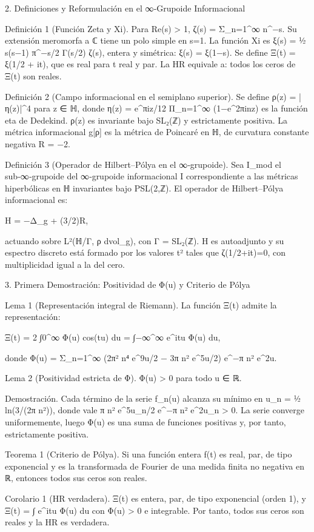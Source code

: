\documentclass[12pt,a4paper]{book}
\begin{document}
2. Definiciones y Reformulación en el ∞‑Grupoide Informacional

Definición 1 (Función Zeta y Xi). Para Re(s) > 1, ζ(s) = Σ_{n=1}^∞ n^{−s}. Su extensión meromorfa a ℂ tiene un polo simple en s=1. La función Xi es ξ(s) = ½ s(s−1) π^{−s/2} Γ(s/2) ζ(s), entera y simétrica: ξ(s) = ξ(1−s). Se define Ξ(t) = ξ(1/2 + it), que es real para t real y par. La HR equivale a: todos los ceros de Ξ(t) son reales.

Definición 2 (Campo informacional en el semiplano superior). Se define ρ(z) = |η(z)|^4 para z ∈ ℍ, donde η(z) = e^{πiz/12} Π_{n=1}^∞ (1−e^{2πinz}) es la función eta de Dedekind. ρ(z) es invariante bajo SL₂(ℤ) y estrictamente positiva. La métrica informacional g[ρ] es la métrica de Poincaré en ℍ, de curvatura constante negativa R = −2.

Definición 3 (Operador de Hilbert–Pólya en el ∞‑grupoide). Sea I_{mod} el sub‑∞‑grupoide del ∞‑grupoide informacional I correspondiente a las métricas hiperbólicas en ℍ invariantes bajo PSL(2,ℤ). El operador de Hilbert–Pólya informacional es:

H = −Δ_g + (3/2)R,

actuando sobre L²(ℍ/Γ, ρ dvol_g), con Γ = SL₂(ℤ). H es autoadjunto y su espectro discreto está formado por los valores t² tales que ζ(1/2+it)=0, con multiplicidad igual a la del cero.

3. Primera Demostración: Positividad de Φ(u) y Criterio de Pólya

Lema 1 (Representación integral de Riemann). La función Ξ(t) admite la representación:

Ξ(t) = 2 ∫0^∞ Φ(u) cos(tu) du = ∫{−∞}^∞ e^{itu} Φ(u) du,

donde Φ(u) = Σ_{n=1}^∞ (2π² n⁴ e^{9u/2} − 3π n² e^{5u/2}) e^{−π n² e^{2u}}.

Lema 2 (Positividad estricta de Φ). Φ(u) > 0 para todo u ∈ ℝ.

Demostración. Cada término de la serie f_n(u) alcanza su mínimo en u_n = ½ ln(3/(2π n²)), donde vale π n² e^{5u_n/2} e^{−π n² e^{2u_n}} > 0. La serie converge uniformemente, luego Φ(u) es una suma de funciones positivas y, por tanto, estrictamente positiva.

Teorema 1 (Criterio de Pólya). Si una función entera f(t) es real, par, de tipo exponencial y es la transformada de Fourier de una medida finita no negativa en ℝ, entonces todos sus ceros son reales.

Corolario 1 (HR verdadera). Ξ(t) es entera, par, de tipo exponencial (orden 1), y Ξ(t) = ∫ e^{itu} Φ(u) du con Φ(u) > 0 e integrable. Por tanto, todos sus ceros son reales y la HR es verdadera.
\end{document}
